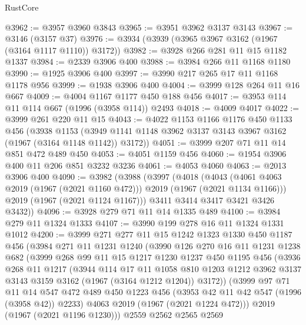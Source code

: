 \begin{lexlean}{RustCore}
\begin{coremodule}
@3962 := @3957 @3960 @3843
@3965 := @3951 @3962 @3137 @3143
@3967 := @3146 (@3157 @37)
@3976 := @3934 (@3939 (@3965 @3967 @3162 (@1967 (@3164 @1117 @1110)) @3172))
@3982 := @3928 @266 @281 @11 @15 @1182 @1337
@3984 := @2339 @3906 @400
@3988 := @3984 @266 @11 @1168 @1180
@3990 := @1925 @3906 @400
@3997 := @3990 @217 @265 @17 @11 @1168 @1178 @956
@3999 := @1938 @3906 @400
@4004 := @3999 @128 @264 @11 @16 @667
@4009 := @4004 @1167 @1177 @450 @188 @456
@4017 := @3953 @114 @11 @114 @667 (@1996 (@3958 @114)) @2493
@4018 := @4009 @4017
@4022 := @3999 @261 @220 @11 @15
@4043 := @4022
    @1153
    @1166
    @1176
    @450
    @1133
    @456
    (@3938
      @1153
      (@3949 @1141 @1148 @3962 @3137 @3143 @3967 @3162 (@1967 (@3164 @1148 @1142)) @3172))
@4051 := @3999 @207 @71 @11 @14 @851 @472 @489 @450
@4053 := @4051 @1159 @456
@4060 := @1954 @3906 @400 @11 @206 @851 @3232 @3236
@4061 := @4053 @4060
@4063 := @2013 @3906 @400
@4090 := @3982
    (@3988
      (@3997
        (@4018
          (@4043 (@4061 @4063 @2019 (@1967 (@2021 @1160 @472))) @2019 (@1967 (@2021 @1134 @1166)))
          @2019
          (@1967 (@2021 @1124 @1167)))
        @3411
        @3414
        @3417
        @3421
        @3426
        @3432))
@4096 := @3928 @279 @71 @11 @14 @1335 @489
@4100 := @3984 @279 @11 @1324 @1333
@4107 := @3990 @199 @278 @16 @11 @1324 @1331 @1012
@4200 := @3999
    @271
    @277
    @11
    @15
    @1242
    @1323
    @1330
    @450
    @1187
    @456
    (@3984
      @271
      @11
      @1231
      @1240
      (@3990
        @126
        @270
        @16
        @11
        @1231
        @1238
        @682
        (@3999
          @268
          @99
          @11
          @15
          @1217
          @1230
          @1237
          @450
          @1195
          @456
          (@3936
            @268
            @11
            @1217
            (@3944
              @114
              @17
              @11
              @1058
              @810
              @1203
              @1212
              @3962
              @3137
              @3143
              @3159
              @3162
              (@1967 (@3164 @1212 @1204))
              @3172))
          (@3999
            @97
            @71
            @11
            @14
            @547
            @472
            @489
            @450
            @1223
            @456
            (@3953 @42 @11 @42 @547 (@1996 (@3958 @42)) @2233)
            @4063
            @2019
            (@1967 (@2021 @1224 @472)))
          @2019
          (@1967 (@2021 @1196 @1230)))
        @2559
        @2562
        @2565
        @2569

\end{coremodule}
\end{lexlean}
